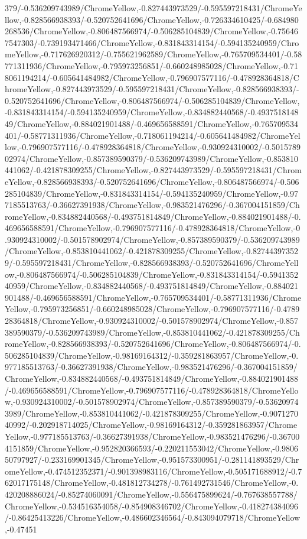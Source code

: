 {\begin{tikzternal}
379/-0.536209743989/ChromeYellow,-0.827443973529/-0.595597218431/ChromeYellow,-0.828566938393/-0.520752641696/ChromeYellow,-0.726334610425/-0.684980268536/ChromeYellow,-0.806487566974/-0.506285104839/ChromeYellow,-0.756467547303/-0.739193471466/ChromeYellow,-0.831843314154/-0.594135240959/ChromeYellow,-0.717626920312/-0.755621962589/ChromeYellow,-0.765709534401/-0.58771311936/ChromeYellow,-0.795973256851/-0.660248985028/ChromeYellow,-0.718061194214/-0.605641484982/ChromeYellow,-0.796907577116/-0.478928364818/ChromeYellow,-0.827443973529/-0.595597218431/ChromeYellow,-0.828566938393/-0.520752641696/ChromeYellow,-0.806487566974/-0.506285104839/ChromeYellow,-0.831843314154/-0.594135240959/ChromeYellow,-0.834882440568/-0.493751814849/ChromeYellow,-0.884021901488/-0.469656588591/ChromeYellow,-0.765709534401/-0.58771311936/ChromeYellow,-0.718061194214/-0.605641484982/ChromeYellow,-0.796907577116/-0.478928364818/ChromeYellow,-0.930924310002/-0.501578902974/ChromeYellow,-0.857389590379/-0.536209743989/ChromeYellow,-0.853810441062/-0.421878309255/ChromeYellow,-0.827443973529/-0.595597218431/ChromeYellow,-0.828566938393/-0.520752641696/ChromeYellow,-0.806487566974/-0.506285104839/ChromeYellow,-0.831843314154/-0.594135240959/ChromeYellow,-0.977185513763/-0.36627391938/ChromeYellow,-0.983521476296/-0.367004151859/ChromeYellow,-0.834882440568/-0.493751814849/ChromeYellow,-0.884021901488/-0.469656588591/ChromeYellow,-0.796907577116/-0.478928364818/ChromeYellow,-0.930924310002/-0.501578902974/ChromeYellow,-0.857389590379/-0.536209743989/ChromeYellow,-0.853810441062/-0.421878309255/ChromeYellow,-0.827443973529/-0.595597218431/ChromeYellow,-0.828566938393/-0.520752641696/ChromeYellow,-0.806487566974/-0.506285104839/ChromeYellow,-0.831843314154/-0.594135240959/ChromeYellow,-0.834882440568/-0.493751814849/ChromeYellow,-0.884021901488/-0.469656588591/ChromeYellow,-0.765709534401/-0.58771311936/ChromeYellow,-0.795973256851/-0.660248985028/ChromeYellow,-0.796907577116/-0.478928364818/ChromeYellow,-0.930924310002/-0.501578902974/ChromeYellow,-0.857389590379/-0.536209743989/ChromeYellow,-0.853810441062/-0.421878309255/ChromeYellow,-0.828566938393/-0.520752641696/ChromeYellow,-0.806487566974/-0.506285104839/ChromeYellow,-0.98169164312/-0.359281863957/ChromeYellow,-0.977185513763/-0.36627391938/ChromeYellow,-0.983521476296/-0.367004151859/ChromeYellow,-0.834882440568/-0.493751814849/ChromeYellow,-0.884021901488/-0.469656588591/ChromeYellow,-0.796907577116/-0.478928364818/ChromeYellow,-0.930924310002/-0.501578902974/ChromeYellow,-0.857389590379/-0.536209743989/ChromeYellow,-0.853810441062/-0.421878309255/ChromeYellow,-0.907127040992/-0.202918714025/ChromeYellow,-0.98169164312/-0.359281863957/ChromeYellow,-0.977185513763/-0.36627391938/ChromeYellow,-0.983521476296/-0.367004151859/ChromeYellow,-0.952820366593/-0.220211553042/ChromeYellow,-0.980650797927/-0.233169901345/ChromeYellow,-0.951573300951/-0.281141893529/ChromeYellow,-0.474512352371/-0.901398983116/ChromeYellow,-0.505171688912/-0.762017175148/ChromeYellow,-0.481812734278/-0.761492731546/ChromeYellow,-0.420208886024/-0.85274060091/ChromeYellow,-0.556475899624/-0.767638557788/ChromeYellow,-0.534516354058/-0.854908346702/ChromeYellow,-0.418274384096/-0.86425413226/ChromeYellow,-0.486602346564/-0.843094079718/ChromeYellow,-0.47451
\end{tikzternal}}
